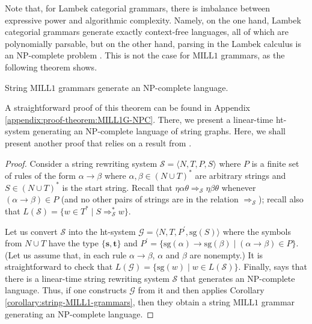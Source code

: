 \documentclass[a4paper,UKenglish,cleveref, autoref, thm-restate,pdfa]{lipics-v2021}
\newcommand{\SG}{\mathrm{sg}}
\newcommand{\lt}{\mathbf{s}}
\newcommand{\rt}{\mathbf{t}}
\newcommand{\MILLFO}{\mathrm{MILL}1}
\begin{document}
Note that, for Lambek categorial grammars, there is imbalance between expressive power and algorithmic complexity. Namely, on the one hand, Lambek categorial grammars generate exactly context-free languages, all of which are polynomially parsable, but on the other hand, parsing in the Lambek calculus is an NP-complete problem \cite{Pentus06}. This is not the case for $\MILLFO$ grammars, as the following theorem shows.
\begin{theorem}\label{theorem:MILL1G-NPC}
	String $\MILLFO$ grammars generate an NP-complete language.
\end{theorem}
A straightforward proof of this theorem can be found in Appendix \ref{appendix:proof-theorem:MILL1G-NPC}. There, we present a linear-time ht-system generating an NP-complete language of string graphs. Here, we shall present another proof that relies on a result from \cite{Book78}.
\begin{proof}
	Consider a string rewriting system $\mathcal{S} = \langle N,T,P,S \rangle$ where $P$ is a finite set of rules of the form $\alpha \to \beta$ where $\alpha,\beta \in (N\cup T)^\ast$ are arbitrary strings and $S \in (N \cup T)^\ast$ is the start string. Recall that $\eta \alpha \theta \Rightarrow_{\mathcal{S}} \eta \beta \theta$ whenever $(\alpha \to \beta) \in P$ (and no other pairs of strings are in the relation $\Rightarrow_{\mathcal{S}}$); recall also that $L(\mathcal{S}) = \{w \in T^\ast \mid S \Rightarrow_{\mathcal{S}}^\ast w \}$. 
	
	Let us convert $\mathcal{S}$ into the ht-system $\mathcal{G} = \langle N, T, P^\prime, \SG(S)\rangle$ where the symbols from $N \cup T$ have the type $\{\lt,\rt\}$ and $P^\prime = \{\SG(\alpha) \to \SG(\beta) \mid (\alpha \to \beta) \in P\}$. (Let us assume that, in each rule $\alpha \to \beta$, $\alpha$ and $\beta$ are nonempty.) It is straightforward to check that $L(\mathcal{G}) = \{\SG(w) \mid w \in L(\mathcal{S})\}$. Finally, \cite[Theorem 1]{Book78} says that there is a linear-time string rewriting system $\mathcal{S}$ that generates an NP-complete language. Thus, if one constructs $\mathcal{G}$ from it and then applies Corollary \ref{corollary:string-MILL1-grammars}, then they obtain a string $\MILLFO$ grammar generating an NP-complete language.
\end{proof}
\end{document}
